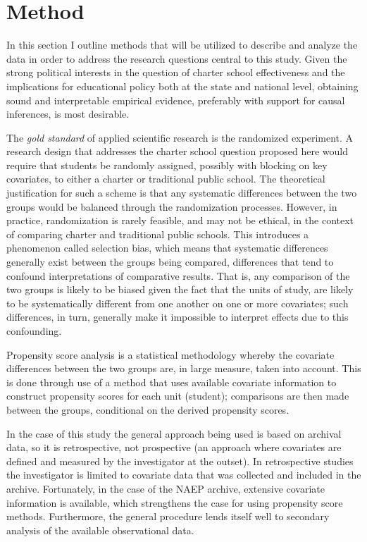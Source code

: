 \documentclass[letterpaper,12pt]{article}
\begin{document}
\section{Method}
In this section I outline methods that will be utilized to describe and analyze the data in order to address the research questions central to this study. Given the strong political interests in the question of charter school effectiveness and the implications for educational policy both at the state and national level, obtaining sound and interpretable empirical evidence, preferably with support for causal inferences, is most desirable. 

The \textit{gold standard} of applied scientific research is the randomized experiment. A research design that addresses the charter school question proposed here would require that students be randomly assigned, possibly with blocking on key covariates, to either a charter or traditional public school. The theoretical justification for such a scheme is that any systematic differences between the two groups would be balanced through the randomization processes. However, in practice, randomization is rarely feasible, and may not be ethical, in the context of comparing charter and traditional public schools. This introduces a phenomenon called selection bias, which means that systematic differences generally exist between the groups being compared, differences that tend to confound interpretations of comparative results. That is, any comparison of the two groups is likely to be biased given the fact that the units of study, are likely to be systematically different from one another on one or more covariates; such differences, in turn, generally make it impossible to interpret effects due to this confounding. 

Propensity score analysis \cite{RosenbaumRubin1983} is a statistical methodology whereby the covariate differences between the two groups are, in large measure, taken into account. This is done through use of a method that uses available covariate information to construct propensity scores for each unit (student); comparisons are then made between the groups, conditional on the derived propensity scores.

In the case of this study the general approach being used is based on archival data, so it is retrospective, not prospective (an approach where covariates are defined and measured by the investigator at the outset). In retrospective studies the investigator is limited to covariate data that was collected and included in the archive. Fortunately, in the case of the NAEP archive, extensive covariate information is available, which strengthens the case for using propensity score methods. Furthermore, the general procedure lends itself well to secondary analysis of the available observational data.
\end{document}
